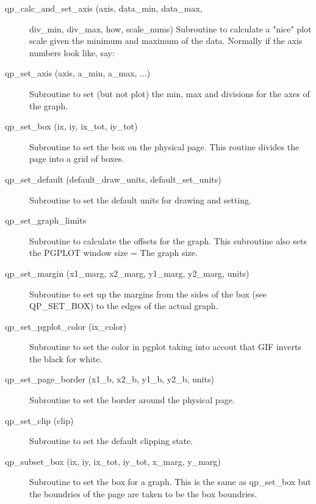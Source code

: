 \begin{description}

\item[qp\_calc\_and\_set\_axis (axis, data\_min, data\_max, ] \Newline
                                    div\_min, div\_max, how, scale\_nums)
     Subroutine to calculate a "nice" plot scale given the minimum and maximum
     of the data. Normally if the axis numbers look like, say:

\item[qp\_set\_axis (axis, a\_min, a\_max, ...)] \Newline
    Subroutine to set (but not plot) the min, max and divisions for the axes of the graph.

\item[qp\_set\_box (ix, iy, ix\_tot, iy\_tot) ] \Newline 
     Subroutine to set the box on the physical page.
     This routine divides the page into a grid of boxes. 

\item[qp\_set\_default (default\_draw\_units, default\_set\_units)] \Newline 
     Subroutine to set the default units for drawing and setting.

\item[qp\_set\_graph\_limits] \Newline 
     Subroutine to calculate the offsets for the graph.
     This subroutine also sets the PGPLOT window size = The graph size.

\item[qp\_set\_margin (x1\_marg, x2\_marg, y1\_marg, y2\_marg, units)] \Newline 
     Subroutine to set up the margins from the sides of the box (see QP\_SET\_BOX)
     to the edges of the actual graph.

\item[qp\_set\_pgplot\_color (ix\_color) ] \Newline 
     Subroutine to set the color in pgplot taking into accout that GIF
     inverts the black for white.

\item[qp\_set\_page\_border (x1\_b, x2\_b, y1\_b, y2\_b, units)] \Newline 
     Subroutine to set the border around the physical page.

\item[qp\_set\_clip (clip)] \Newline 
     Subroutine to set the default clipping state.

\item[qp\_subset\_box (ix, iy, ix\_tot, iy\_tot, x\_marg, y\_marg)] \Newline 
     Subroutine to set the box for a graph. This is the same as
     qp\_set\_box but the boundries of the page are taken to be the box boundries.


\end{description}
